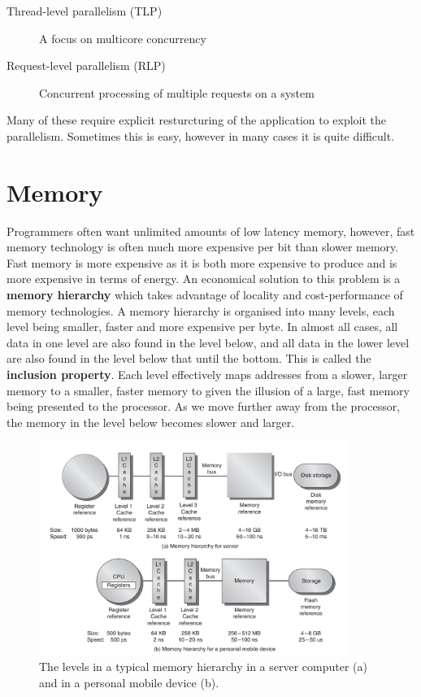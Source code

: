 \documentclass[11pt]{article}
\begin{document}
\begin{description}
\item[{Thread-level parallelism (TLP)}] A focus on multicore concurrency
\end{description}

\begin{description}
\item[{Request-level parallelism (RLP)}] Concurrent processing of multiple requests on a system
\end{description}
\noindent
Many of these require explicit resturcturing of the application to exploit the parallelism. Sometimes this is easy, however in many cases it is quite difficult.
\section{Memory}
Programmers often want unlimited amounts of low latency memory, however, fast memory technology is often much more expensive per bit than slower memory. Fast memory is more expensive as it is both more expensive to produce and is more expensive in terms of energy. An economical solution to this problem is a \textbf{memory hierarchy} which takes advantage of locality and cost-performance of memory technologies. A memory hierarchy is organised into many levels, each level being smaller, faster and more expensive per byte. In almost all cases, all data in one level are also found in the level below, and all data in the lower level are also found in the level below that until the bottom. This is called the \textbf{inclusion property}.
\n
Each level effectively maps addresses from a slower, larger memory to a smaller, faster memory to given the illusion of a large, fast memory being presented to the processor. As we move further away from the processor, the memory in the level below becomes slower and larger.
\begin{figure}[H]
\centering
\includegraphics[width=0.9\textwidth, keepaspectratio]{imgs/memory-hierarchy.png}
\caption{The levels in a typical memory hierarchy in a server computer (a) and in a personal mobile device (b).}
\end{figure}
\end{document}
